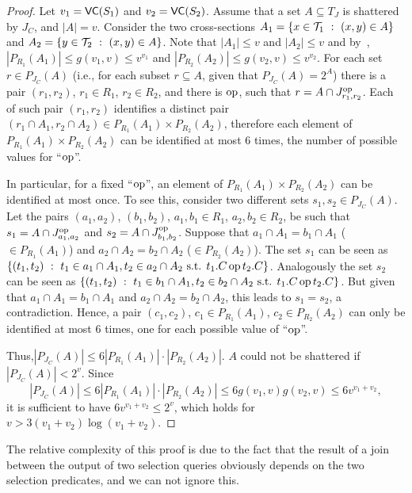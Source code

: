 \begin{proof}
  Let $v_1=\mathsf{VC}(S_1)$ and $v_2=\mathsf{VC}(S_2)$. Assume that a set $A\subseteq T_J$ is
  shattered by $J_C$, and $|A|=v$.  Consider the two cross-sections $A_1 =
  \{x\in {\cal T}_1 ~:~ (x,y)\in A\}$ and $A_2 = \{y\in {\cal T}_2 ~:~ (x,y)\in A\}$.
  Note that $|A_1|\leq v$ and $|A_2|\leq v$ and
  by~\citep[Corol.~14.4.3]{AlonS08}, %
  $|P_{R_1} (A_1)|\leq g(v_1,v)\le v^{v_1}$ and $|P_{R_2}
  (A_2)|\leq g(v_2,v) \le v^{v_2}$. For each set $r \in
  P_{J_C}(A)$ (i.e., for each subset $r\subseteq A$, given that
  $P_{J_C}(A)=2^A$)  there is a pair $(r_1,r_2)$, $r_1\in R_1$, $r_2\in R_2$,
  and there is $\operatorname{op}$, such that $r = A \cap J^{\operatorname{op}}_{r_1,r_2}$. Each of such
  pair $(r_1,r_2)$ identifies a distinct pair $(r_1\cap A_1, r_2\cap A_2) \in
  P_{R_1}(A_1)\times P_{R_2}(A_2)$, therefore each element of
  $P_{R_1}(A_1)\times P_{R_2}(A_2)$ can be identified at most $6$ times, the
  number of possible values for ``$\operatorname{op}$''. 

  In particular, for a fixed ``$\operatorname{op}$'', an element of $P_{R_1}(A_1)\times
  P_{R_2}(A_2)$ can be identified at most once.  To see this, consider two
  different sets $s_1, s_2 \in P_{J_C}(A)$. Let the pairs $(a_1,a_2)$,
  $(b_1,b_2)$, $a_1,b_1\in R_1$, $a_2,b_2\in R_2$, be such that $s_1 = A \cap
  J^{\operatorname{op}}_{a_1,a_2}$ and $s_2 = A \cap J^{\operatorname{op}}_{b_1,b_2}$. Suppose that $a_1\cap
  A_1 = b_1\cap A_1$  ($\in P_{R_1}(A_1)$) and $ a_2 \cap A_2 = b_2 \cap A_2$
  ($\in P_{R_2}(A_2)$). The set $s_1$ can be seen as $\{(t_1,t_2) ~:~ t_1\in
  a_1\cap A_1, t_2\in a_2\cap A_2 \mbox{ s.t.  } t_1.C \operatorname{op} t_2.C\}$. Analogously
  the set $s_2$ can be seen as $\{(t_1,t_2) ~:~ t_1\in b_1\cap A_1, t_2\in
  b_2\cap A_2 \mbox{ s.t. } t_1.C \operatorname{op} t_2.C\}$. But given that $a_1\cap A_1 =
  b_1\cap A_1$ and $ a_2 \cap A_2 = b_2 \cap A_2$, this leads to $s_1=s_2$, a
  contradiction. Hence, a pair $(c_1,c_2)$, $c_1\in P_{R_1}(A_1)$, $c_2\in
  P_{R_2}(A_2)$ can only be identified at most $6$ times, one for each possible
  value of ``$\operatorname{op}$''.  

  Thus,$ |P_{J_C} (A)|\leq 6|P_{R_1} (A_1)|\cdot |P_{R_2} (A_2)|.$ $A$ could not
  be shattered if $|P_{J_C}(A)|< 2^v$. Since 
  \[
  |P_{J_C}(A)|\leq 6|P_{R_1} (A_1)|\cdot |P_{R_2} (A_2)|\leq
  6g(v_1,v)g(v_2,v)\leq 6v^{v_1+v_2}, %
  \]
  it is sufficient to have $6v^{v_1+v_2}\le 2^v$, which holds for $v>
  3(v_1+v_2)\log(v_1+v_2)$.
\end{proof}

The relative complexity of this proof is due to the fact that the result of a
join between the output of two selection queries obviously depends on the two
selection predicates, and we can not ignore this. 

